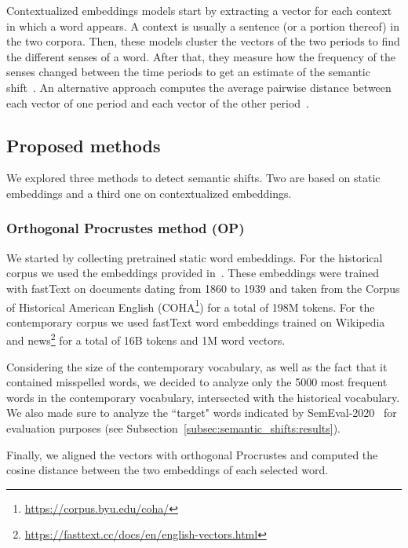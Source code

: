 \documentclass[runningheads]{llncs}
\begin{document}
Contextualized embeddings models start by extracting a vector for each context in which a word appears. A context is  usually a sentence (or a portion thereof) in the two corpora. Then, these models cluster the vectors of the two periods to find the different senses of a word. After that, they measure how the frequency of the senses changed between the time periods to get an estimate of the semantic shift~\cite{giulianelli-etal-2020-analysing,rother-etal-2020-cmce}. An alternative approach computes the average pairwise distance between each vector of one period and each vector of the other period~\cite{laicher-etal-2021-explaining}.  
 

\subsection{Proposed methods}
\label{subsec:semantic_shifts:methods}

We explored three methods to detect semantic shifts. Two are based on static embeddings and a third one on contextualized embeddings.

\subsubsection{Orthogonal Procrustes method (OP)} We started by collecting pretrained static word embeddings. For the historical corpus we used the embeddings provided in~\cite{sprugnoli-tonelli-2019-histo}. These embeddings were trained with fastText on documents dating from 1860 to 1939 and taken from the Corpus of Historical American English (COHA\footnote{\url{https://corpus.byu.edu/coha/}}) for a total of 198M tokens. For the contemporary corpus we used fastText word embeddings trained on Wikipedia and news\footnote{\url{https://fasttext.cc/docs/en/english-vectors.html}} for a total of 16B tokens and 1M word vectors.

Considering the size of the contemporary vocabulary, as well as the fact that it contained misspelled words, we decided to analyze only the 5000 most frequent words in the contemporary vocabulary, intersected with the historical vocabulary. We also made sure to analyze the “target" words indicated by SemEval-2020~\cite{schlechtweg-etal-2020-semeval} for evaluation purposes (see Subsection~\ref{subsec:semantic_shifts:results}).

Finally, we aligned the vectors with orthogonal Procrustes and computed the cosine distance between the two embeddings of each selected word.
\end{document}
